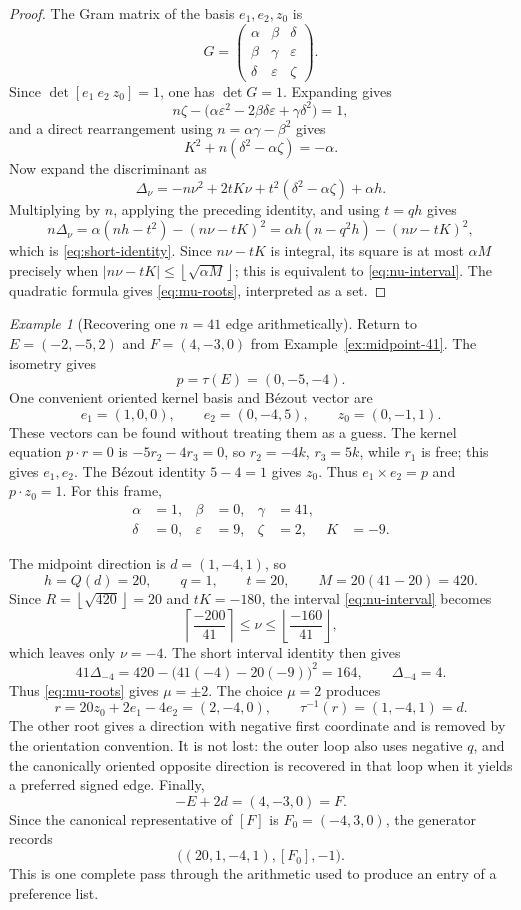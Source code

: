 \documentclass[11pt]{amsart}
\theoremstyle{definition}
\theoremstyle{remark}
\newtheorem{example}[theorem]{Example}
\newcommand{\ceil}[1]{\left\lceil #1\right\rceil}
\newcommand{\floor}[1]{\left\lfloor #1\right\rfloor}
\begin{document}
\begin{proof}
The Gram matrix of the basis $e_1,e_2,z_0$ is
\[
 G=\begin{pmatrix}
 \alpha&\beta&\delta\\
 \beta&\gamma&\varepsilon\\
 \delta&\varepsilon&\zeta
 \end{pmatrix}.
\]
Since $\det[e_1\ e_2\ z_0]=1$, one has $\det G=1$.  Expanding gives
\[
 n\zeta-\bigl(\alpha\varepsilon^2-2\beta\delta\varepsilon
 +\gamma\delta^2\bigr)=1,
\]
and a direct rearrangement using $n=\alpha\gamma-\beta^2$ gives
\[
 K^2+n(\delta^2-\alpha\zeta)=-\alpha.
\]
Now expand the discriminant as
\[
 \Delta_\nu=-n\nu^2+2tK\nu+t^2(\delta^2-\alpha\zeta)+\alpha h.
\]
Multiplying by $n$, applying the preceding identity, and using $t=qh$ gives
\[
 n\Delta_\nu
 =\alpha(nh-t^2)-(n\nu-tK)^2
 =\alpha h(n-q^2h)-(n\nu-tK)^2,
\]
which is \eqref{eq:short-identity}.  Since $n\nu-tK$ is integral, its
square is at most $\alpha M$ precisely when
$|n\nu-tK|\le\floor{\sqrt{\alpha M}}$; this is equivalent to
\eqref{eq:nu-interval}.  The quadratic formula gives
\eqref{eq:mu-roots}, interpreted as a set.
\end{proof}

\begin{example}[Recovering one $n=41$ edge arithmetically]
\label{ex:lattice-41}
Return to $E=(-2,-5,2)$ and $F=(4,-3,0)$ from
Example~\ref{ex:midpoint-41}.  The isometry gives
\[
 p=\tau(E)=(0,-5,-4).
\]
One convenient oriented kernel basis and B\'ezout vector are
\[
 e_1=(1,0,0),
 \qquad
 e_2=(0,-4,5),
 \qquad
 z_0=(0,-1,1).
\]
These vectors can be found without treating them as a guess.  The kernel
equation $p\cdot r=0$ is $-5r_2-4r_3=0$, so
$r_2=-4k$, $r_3=5k$, while $r_1$ is free; this gives $e_1,e_2$.
The B\'ezout identity $5-4=1$ gives $z_0$.  Thus
$e_1\times e_2=p$ and $p\cdot z_0=1$.  For this frame,
\[
 \begin{aligned}
  \alpha&=1,& \beta&=0,& \gamma&=41,\\
  \delta&=0,& \varepsilon&=9,& \zeta&=2,& K&=-9.
 \end{aligned}
\]

The midpoint direction is $d=(1,-4,1)$, so
\[
 h=Q(d)=20,\qquad q=1,\qquad t=20,\qquad M=20(41-20)=420.
\]
Since $R=\floor{\sqrt{420}}=20$ and $tK=-180$, the interval
\eqref{eq:nu-interval} becomes
\[
 \ceil{\frac{-200}{41}}\le \nu\le
 \floor{\frac{-160}{41}},
\]
which leaves only $\nu=-4$.  The short interval identity then gives
\[
 41\Delta_{-4}=420-\bigl(41(-4)-20(-9)\bigr)^2=164,
 \qquad \Delta_{-4}=4.
\]
Thus \eqref{eq:mu-roots} gives $\mu=\pm2$.  The choice $\mu=2$ produces
\[
 r=20z_0+2e_1-4e_2=(2,-4,0),
 \qquad
 \tau^{-1}(r)=(1,-4,1)=d.
\]
The other root gives a direction with negative first coordinate and is removed
by the orientation convention.  It is not lost: the outer loop also uses
negative $q$, and the canonically oriented opposite direction is recovered in
that loop when it yields a preferred signed edge.  Finally,
\[
 -E+2d=(4,-3,0)=F.
\]
Since the canonical representative of $[F]$ is $F_0=(-4,3,0)$, the generator
records
\[
 \bigl((20,1,-4,1),[F_0],-1\bigr).
\]
This is one complete pass through the arithmetic used to produce an entry of a
preference list.
\end{example}
\end{document}
